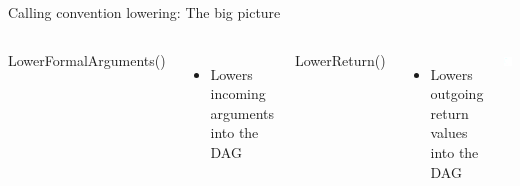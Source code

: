 
\begin{frame}[fragile]{Calling convention lowering: The big picture}

\begin{columns}[t]
    LowerFormalArguments()
    \begin{itemize}
        \item Lowers incoming arguments into the DAG
    \end{itemize}

    LowerReturn()
    \begin{itemize}
        \item Lowers outgoing return values into the DAG
    \end{itemize}
    
    \begin{block}{}
        \vspace{-5ex}
        \includegraphics[width = 1.0\textwidth]{examples/ex1b-pre-isel.pdf}
    \end{block}
\end{columns}    

\end{frame}

